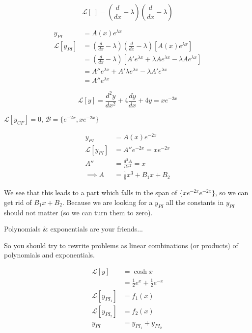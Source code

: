 \documentclass[10pt]{scrartcl}
\begin{document}

\[\mathcal{L}[~] = \left(\frac{d}{dx} -\lambda\right)\left(\frac{d}{dx} -\lambda\right)\]

\[
\begin{aligned}
  y_{PI} &= A(x)e^{\lambda x}\\
  \mathcal{L}[y_{PI}] &= \left(\frac{d}{dx}-\lambda\right)\left(\frac{d}{dx}-\lambda\right)[A(x)e^{\lambda x}]\\
  &= \left(\frac{d}{dx}-\lambda\right)[A'e^{\lambda x}+\lambda Ae^{\lambda x}-\lambda Ae^{\lambda x}]\\
  &= A''e^{\lambda x}+A'\lambda e^{\lambda x}-\lambda A'e^{\lambda x}\\
  &= A''e^{\lambda x}
\end{aligned}
\]\vspace*{5pt}

\begin{example}
\[\mathcal{L}[y] = \frac{d^2y}{dx^2}+4\frac{dy}{dx}+4y = xe^{-2x}\]	

$\mathcal{L}[y_{CF}] = 0$, $\mathcal{B} = \{e^{-2x},xe^{-2x}\}$

\[
\begin{aligned}
  y_{PI} &= A(x)e^{-2x}\\
  \mathcal{L}[y_{PI}] &= A''e^{-2x} = xe^{-2x}\\
  A'' &= \frac{d^2A}{dx^2} = x\\
  \implies A &= \frac{1}{6}x^3 + B_1x + B_2
\end{aligned}
\]

We see that this leads to a part which falls in the span of $\{xe^{-2x} e^{-2x}\}$, so we can get rid of $B_1x + B_2$. Because we are looking for a $y_{PI}$ all the constants in $y_{PI}$ should not matter (so we can turn them to zero). 
\end{example}\vspace*{5pt}

\begin{theorem}
Polynomials \& exponentials are your friends...	\end{theorem}
So you should try to rewrite problems as linear combinations (or products) of polynomials and exponentials.\\

\begin{example}
	\[
\begin{aligned}
  \mathcal{L}[y] &= \cosh x\\
  &= \frac{1}{2}e^x + \frac{1}{2}e^{-x}\\
  \mathcal{L}[y_{PI_1}] &= f_1(x)\\
  \mathcal{L}[y_{PI_2}] &= f_2(x)\\
  y_{PI} &= y_{PI_1} + y_{PI_2}
\end{aligned}
\]
\end{example}~\vspace*{5pt}
\end{document}
